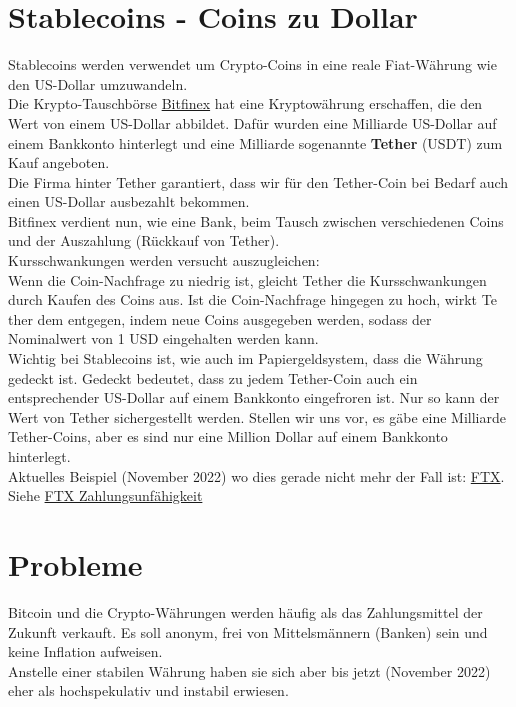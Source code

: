 \documentclass[10pt,a4paper,titlepage]{paper}
\begin{document}
\section{Stablecoins - Coins zu Dollar}
Stablecoins werden verwendet um Crypto-Coins in eine reale Fiat-Währung wie den US-Dollar umzuwandeln.\\
Die Krypto-Tauschbörse \href{https://www.bitfinex.com/}{\color{blue}Bitfinex}
hat eine Kryptowährung erschaffen, die den Wert von einem US-Dollar abbildet.
Dafür wurden eine Milliarde US-Dollar auf einem Bankkonto hinterlegt und eine
Milliarde sogenannte \textbf{Tether} (USDT) zum Kauf angeboten.\\
Die Firma hinter Tether garantiert, dass wir für den Tether-Coin bei Bedarf auch einen US-Dollar ausbezahlt bekommen.\\
Bitfinex verdient nun, wie eine Bank, beim Tausch zwischen verschiedenen Coins und der Auszahlung (Rückkauf von Tether).\\
Kursschwankungen werden versucht auszugleichen:\\ 
Wenn die Coin-Nachfrage zu niedrig ist, gleicht Tether die Kursschwankungen
durch Kaufen des Coins aus. Ist die Coin-Nachfrage hingegen zu hoch, wirkt Te
ther dem entgegen, indem neue Coins ausgegeben werden, sodass der Nominalwert von 1 USD eingehalten werden kann.\vspace{.3cm}\\
Wichtig bei Stablecoins ist, wie auch im Papiergeldsystem, dass die Währung gedeckt ist. Gedeckt bedeutet, dass zu jedem Tether-Coin auch ein entsprechender US-Dollar auf einem Bankkonto eingefroren ist. Nur so kann der Wert von Tether sichergestellt werden. Stellen wir uns vor, es gäbe eine Milliarde Tether-Coins, aber es sind nur eine Million Dollar auf einem Bankkonto hinterlegt.\\
Aktuelles Beispiel (November 2022) wo dies gerade nicht mehr der Fall ist: \href{https://ftx.com/}{\color{blue}FTX}. Siehe \href{https://www.n-tv.de/wirtschaft/Bei-FTX-soll-mindestens-eine-Milliarde-Dollar-fehlen-article23713547.html}{\color{blue}FTX Zahlungsunfähigkeit}




\section{Probleme}
Bitcoin und die Crypto-Währungen werden häufig als das Zahlungsmittel der Zukunft verkauft. Es soll anonym, frei von Mittelsmännern (Banken) sein und keine Inflation aufweisen.\\
Anstelle einer stabilen Währung haben sie sich aber bis jetzt (November 2022) eher als hochspekulativ und instabil erwiesen.
\end{document}
